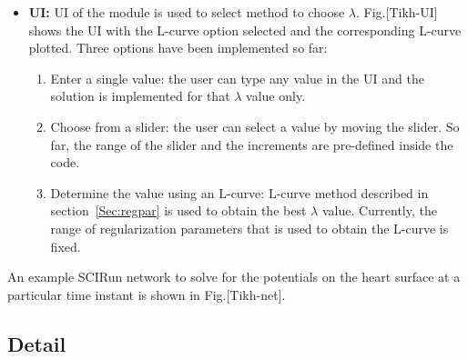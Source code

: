 \begin{itemize}
  \item {\bf UI:} UI of the  module is used to select
                method to choose $\lambda$. Fig.[Tikh-UI] shows the UI with
                the L-curve option selected and the corresponding L-curve
                plotted. Three options have been implemented so far:
        \begin{enumerate}         
          \item Enter a single value: the user can type any value in the UI
                and the solution is implemented for that $\lambda$ value
                only. 
          \item Choose from a slider: the user can select a value by moving
                the slider. So far, the range of the slider and the
                increments are pre-defined inside the code. 
          \item Determine the value using an L-curve: L-curve method
                described in section~\ref{Sec:regpar} is used to obtain the
                best $\lambda$ value. Currently, the range of
                regularization parameters that is used to obtain the
                L-curve is fixed. 
        \end{enumerate}
      
\end{itemize}

An example SCIRun network to solve for the potentials on the heart surface
at a particular time instant is shown in Fig.[Tikh-net]. 


\subsection{Detail}

